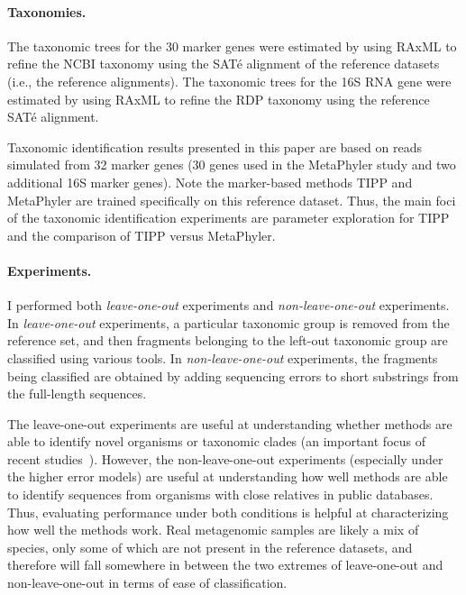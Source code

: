 \paragraph{\bf Taxonomies. }
The taxonomic trees for the 30 marker genes were estimated by 
using RAxML \cite{Stamatakis2006} to refine the NCBI taxonomy using 
the SAT\'{e} alignment of the reference datasets (i.e., the reference
alignments).
The taxonomic trees for the 16S RNA gene were estimated by 
using RAxML to refine the RDP taxonomy using 
the reference SAT\'{e} alignment.  

Taxonomic identification results presented in this paper are based on reads simulated from 32 marker genes (30 genes used in the MetaPhyler study and two additional 16S marker genes).  Note the marker-based methods TIPP and MetaPhyler are trained specifically on this reference dataset.  Thus, the main 
foci of the taxonomic identification experiments are parameter exploration for TIPP and 
the comparison of TIPP versus MetaPhyler.

\paragraph{\bf Experiments. } 
I performed both \textit{leave-one-out} experiments and \textit{non-leave-one-out} experiments.  In \textit{leave-one-out} experiments, a particular taxonomic group is removed from the reference set, 
and   then fragments belonging to the left-out taxonomic group are classified using various tools.  In \textit{non-leave-one-out} experiments, the fragments being classified are obtained by adding sequencing errors to short substrings from the full-length sequences.  



The leave-one-out experiments are useful at understanding whether methods are able to identify novel organisms or taxonomic clades (an important focus of recent studies~\cite{eisen}). However, the non-leave-one-out experiments (especially under the higher error models) are useful at understanding how well methods are able to identify sequences from organisms with close relatives in public databases.  Thus, evaluating performance under both conditions is helpful at characterizing how well the methods work.  Real metagenomic samples are likely a mix of species, only some of which are not present in the reference datasets, and therefore will fall somewhere in between the two extremes of leave-one-out and non-leave-one-out in terms of ease of classification.

